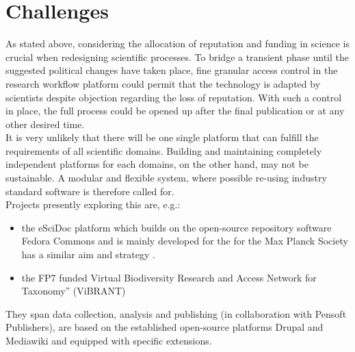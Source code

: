 \documentclass{article}
\begin{document}
\section{Challenges}

As stated above, considering the allocation of reputation and funding
in science is crucial when redesigning scientific processes. To bridge
a transient phase until the suggested political changes have taken
place, fine granular access control in the research workflow platform
could permit that the technology is adapted by scientists despite
objection regarding the loss of reputation. With such a control in
place, the full process could be opened up after the final publication
or at any other desired time.\\

It is very unlikely that there will be one single platform that can
fulfill the requirements of all scientific domains. Building and
maintaining completely independent platforms for each domains, on the
other hand, may not be sustainable. A modular and flexible system,
where possible re-using industry standard software is therefore called
for.\\

Projects presently exploring this are, e.g.:

\begin{itemize}
\item the eSciDoc platform which builds on the open-source repository
  software Fedora Commons \cite{Feudora} and is mainly developed for
  the for the Max Planck Society has a similar aim and strategy
  \cite{Dreyer}.
\item the FP7 funded Virtual Biodiversity Research and Access Network
  for Taxonomy'' (ViBRANT) \cite{ViBRANT, Roberts, Blagoderov}
\end{itemize}

They span data collection, analysis and publishing (in collaboration
with Pensoft Publishers), are based on the established open-source
platforms Drupal \cite{Drupal} and Mediawiki \cite{Mediawiki} and
equipped with specific extensions.
\end{document}
